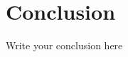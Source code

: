 \documentclass{sig-alternate}
\begin{document}
\section{Conclusion}
Write your conclusion here

%
\end{document}
